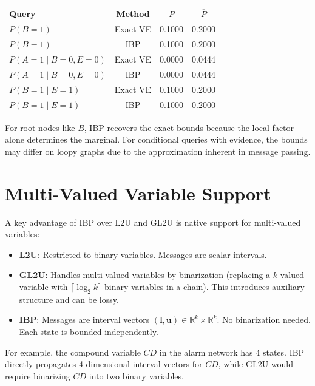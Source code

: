 \documentclass[11pt]{article}
\begin{document}
\begin{center}
\begin{tabular}{lccc}
\toprule
\textbf{Query} & \textbf{Method} & $\underline{P}$ & $\overline{P}$ \\
\midrule
$P(B{=}1)$ & Exact VE & 0.1000 & 0.2000 \\
$P(B{=}1)$ & IBP & 0.1000 & 0.2000 \\
\midrule
$P(A{=}1 \mid B{=}0, E{=}0)$ & Exact VE & 0.0000 & 0.0444 \\
$P(A{=}1 \mid B{=}0, E{=}0)$ & IBP & 0.0000 & 0.0444 \\
\midrule
$P(B{=}1 \mid E{=}1)$ & Exact VE & 0.1000 & 0.2000 \\
$P(B{=}1 \mid E{=}1)$ & IBP & 0.1000 & 0.2000 \\
\bottomrule
\end{tabular}
\end{center}

For root nodes like $B$, IBP recovers the exact bounds because the local factor
alone determines the marginal. For conditional queries with evidence, the bounds
may differ on loopy graphs due to the approximation inherent in message passing.

\section{Multi-Valued Variable Support}

A key advantage of IBP over L2U and GL2U is native support for multi-valued
variables:

\begin{itemize}
  \item \textbf{L2U}: Restricted to binary variables. Messages are scalar intervals.
  \item \textbf{GL2U}: Handles multi-valued variables by binarization (replacing a
        $k$-valued variable with $\lceil \log_2 k \rceil$ binary variables in a chain).
        This introduces auxiliary structure and can be lossy.
  \item \textbf{IBP}: Messages are interval vectors $(\mathbf{l}, \mathbf{u}) \in
        \mathbb{R}^k \times \mathbb{R}^k$. No binarization needed. Each state is
        bounded independently.
\end{itemize}

For example, the compound variable $CD$ in the alarm network has 4 states. IBP
directly propagates 4-dimensional interval vectors for $CD$, while GL2U would
require binarizing $CD$ into two binary variables.
\end{document}
